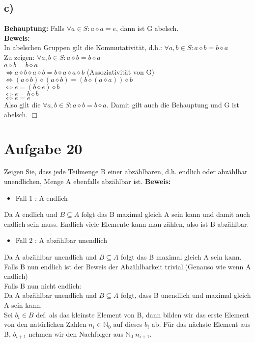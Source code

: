 \documentclass[paper = a4, ngerman]{scrartcl}
\begin{document}
	\subsection*{c)}
	\textbf{Behauptung:} Falls $\forall a \in S: a \diamond a = e $, dann ist G abelsch.\\
	
	\textbf{Beweis:}\\
	In abelschen Gruppen gilt die Kommutativität, d.h.: $\forall a, b \in S: a \diamond b = b \diamond a$\\
	
	Zu zeigen: $\forall a, b \in S: a \diamond b = b \diamond a$\\
	
	$a \diamond b = b \diamond a$\\
	$\Leftrightarrow a \diamond b \diamond a \diamond b = b \diamond a\diamond a \diamond b$ \hspace{10mm}(Assoziativität von G)\\
	$\Leftrightarrow (a \diamond b) \diamond (a \diamond b) = (b \diamond (a\diamond a)) \diamond b$  \\
	$\Leftrightarrow e = (b \diamond e) \diamond b$  \\
	$\Leftrightarrow e = b \diamond b$  \\
	$\Leftrightarrow e = e$\\
	
	Also gilt die $\forall a, b \in S: a \diamond b = b \diamond a$. Damit gilt auch die Behauptung und G ist abelsch.
		\hfill$\Box$\\
	
	\section*{Aufgabe 20}
Zeigen Sie, dass jede Teilmenge B einer abzählbaren, d.h. endlich oder abzählbar unendlichen, Menge A ebenfalls abzählbar ist.
\textbf{Beweis:}
\begin{itemize}
	\item Fall 1 : A endlich
\end{itemize}
Da A endlich und $B \subseteq A$  folgt das B maximal gleich A sein kann und damit auch endlich sein muss. Endlich viele Elemente kann man zählen, also ist B abzählbar.
\begin{itemize}
	\item Fall 2 : A abzählbar unendlich
\end{itemize}
Da A abzählbar unendlich und $B \subseteq A$  folgt das B maximal gleich A sein kann.\\
Falls B nun endlich ist der Beweis der Abzählbarkeit trivial.(Genauso wie wenn A endlich)\\

Falls B nun nicht endlich:\\
Da A abzählbar unendlich und $B \subseteq A$  folgt, dass B unendlich und maximal gleich A sein kann.\\
 Sei $b_i \in B$ def. als das kleinste Element von B, dann bilden wir das erste Element von den natürlichen Zahlen $n_i \in \mathbb{N}_{0}$ auf dieses $b_i$ ab. Für das nächste Element aus B, $b_{i+1}$ nehmen wir den Nachfolger aus $\mathbb{N}_{0}\; n_{i+1}$.	
	

	
	
\end{document}
